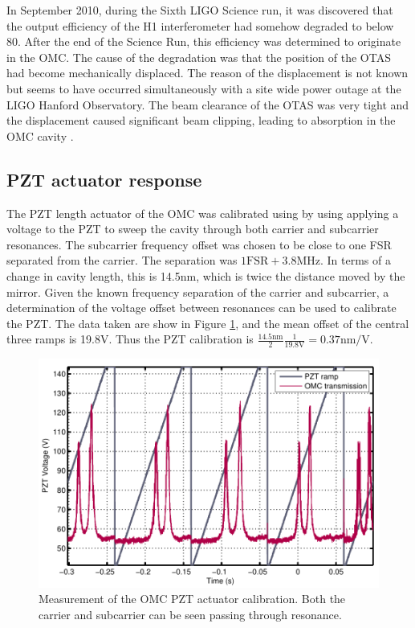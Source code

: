 In September 2010, during the Sixth LIGO Science run, it was discovered that the output efficiency of the H1 interferometer had somehow degraded to below 80\perc{}. %
After the end of the Science Run, this efficiency was determined to originate in the OMC. %
The cause of the degradation was that the position of the OTAS had become mechanically displaced. %
The reason of the displacement is not known but seems to have occurred simultaneously with a site wide power outage at the LIGO Hanford Observatory. %
The beam clearance of the OTAS was very tight and the displacement caused significant beam clipping, leading to absorption in the OMC cavity \cite{T1100562}.

\subsection{PZT actuator response}
The PZT length actuator of the OMC was calibrated using by using applying a voltage to the PZT to sweep the cavity through both carrier and subcarrier resonances. %
The subcarrier frequency offset was chosen to be close to one FSR separated from the carrier. %
The separation was $1\mathrm{FSR}+3.8$MHz. %
In terms of a change in cavity length, this is 14.5nm, which is twice the distance moved by the mirror. %
Given the known frequency separation of the carrier and subcarrier, a determination of the voltage offset between resonances can be used to calibrate the PZT. %
The data taken are show in Figure \ref{fig:pztsweep}, and the mean offset of the central three ramps is 19.8V. %
Thus the PZT calibration is $\frac{14.5\text{nm}}{2}\frac{1}{19.8\text{V}}=0.37\text{nm}/\text{V}$.
\begin{figure}
  \begin{center}
  \leavevmode
  \includegraphics{figs-omc/pztdccal.pdf}
  \end{center}
  \caption[Measurement of the OMC PZT actuator calibration.]{Measurement of the OMC PZT actuator calibration. Both the carrier and subcarrier can be seen passing through resonance.}
  \label{fig:pztsweep}
\end{figure}

